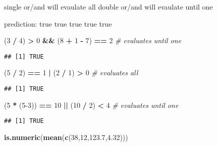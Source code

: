 \documentclass[
]{article}
\newenvironment{Shaded}{\begin{snugshade}}{\end{snugshade}}
\newcommand{\CommentTok}[1]{\textcolor[rgb]{0.56,0.35,0.01}{\textit{#1}}}
\newcommand{\DecValTok}[1]{\textcolor[rgb]{0.00,0.00,0.81}{#1}}
\newcommand{\FloatTok}[1]{\textcolor[rgb]{0.00,0.00,0.81}{#1}}
\newcommand{\FunctionTok}[1]{\textcolor[rgb]{0.13,0.29,0.53}{\textbf{#1}}}
\newcommand{\NormalTok}[1]{#1}
\newcommand{\SpecialCharTok}[1]{\textcolor[rgb]{0.81,0.36,0.00}{\textbf{#1}}}
\begin{document}
single or/and will evaulate all double or/and will evaulate until one

prediction: true true true true true

\begin{Shaded}
\begin{Highlighting}[]
\NormalTok{(}\DecValTok{3} \SpecialCharTok{/} \DecValTok{4}\NormalTok{) }\SpecialCharTok{\textgreater{}} \DecValTok{0} \SpecialCharTok{\&\&}\NormalTok{ (}\DecValTok{8} \SpecialCharTok{+} \DecValTok{1} \SpecialCharTok{{-}} \DecValTok{7}\NormalTok{) }\SpecialCharTok{==} \DecValTok{2} \CommentTok{\# evaluates until one}
\end{Highlighting}
\end{Shaded}

\begin{verbatim}
## [1] TRUE
\end{verbatim}

\begin{Shaded}
\begin{Highlighting}[]
\NormalTok{(}\DecValTok{5} \SpecialCharTok{/} \DecValTok{2}\NormalTok{) }\SpecialCharTok{==} \DecValTok{1} \SpecialCharTok{|}\NormalTok{ (}\DecValTok{2} \SpecialCharTok{/} \DecValTok{1}\NormalTok{) }\SpecialCharTok{\textgreater{}} \DecValTok{0} \CommentTok{\# evaluates all}
\end{Highlighting}
\end{Shaded}

\begin{verbatim}
## [1] TRUE
\end{verbatim}

\begin{Shaded}
\begin{Highlighting}[]
\NormalTok{(}\DecValTok{5} \SpecialCharTok{*}\NormalTok{ (}\DecValTok{5{-}3}\NormalTok{)) }\SpecialCharTok{==} \DecValTok{10} \SpecialCharTok{||}\NormalTok{ (}\DecValTok{10} \SpecialCharTok{/} \DecValTok{2}\NormalTok{) }\SpecialCharTok{\textless{}} \DecValTok{4} \CommentTok{\# evaluates until one}
\end{Highlighting}
\end{Shaded}

\begin{verbatim}
## [1] TRUE
\end{verbatim}

\begin{Shaded}
\begin{Highlighting}[]
\FunctionTok{is.numeric}\NormalTok{(}\FunctionTok{mean}\NormalTok{(}\FunctionTok{c}\NormalTok{(}\DecValTok{38}\NormalTok{,}\DecValTok{12}\NormalTok{,}\FloatTok{123.7}\NormalTok{,}\FloatTok{4.32}\NormalTok{)))}
\end{Highlighting}
\end{Shaded}
\end{document}
